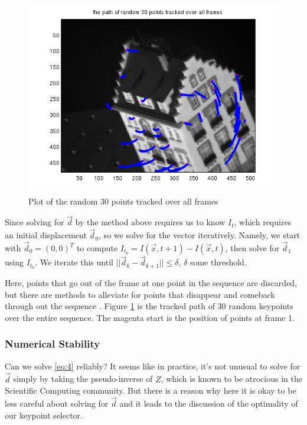\begin{figure}[!ht]
  \begin{center}
  \includegraphics[scale=0.5]{tracked.png}
  \caption{Plot of the random 30 points tracked over all frames} 
  \label{fig:track}
  \end{center}
\end{figure}
Since solving for $\vec d$ by the method above requires us to know
$I_t$, which requires an initial displacement $\vec d_0$, so we solve
for the vector iteratively. Namely, we start with $\vec d_0
=(0,0)^T$ to compute $I_{t_0} = I(\vec x, t+1) - I(\vec x, t)$, then
solve for $\vec d_1$ using $I_{t_0}$. We iterate this until $||\vec
d_k - \vec d_{k+1}|| \le \delta$, $\delta$ some threshold.

Here, points that go out of the frame at one point in the sequence are discarded, but there are
methods to alleviate for points that disappear and comeback through
out the sequence \cite{Morita}. 
Figure \ref{fig:track} is the tracked path of 30 random keypoints over
the entire sequence. The magenta start is the position of points at frame 1.

\subsubsection{Numerical Stability}
\label{sec:numerical-stability}
Can we solve \eqref{eq:4} reliably? It seems like in practice, it's
not unusual to solve for $\vec d$ simply by taking the pseudo-inverse of $Z$,
which is known to be atrocious in the Scientific Computing
community. But there is a reason why here it is okay to be less
careful about solving for $\vec d$ and it leads to the discussion of
the optimality of our keypoint selector.

